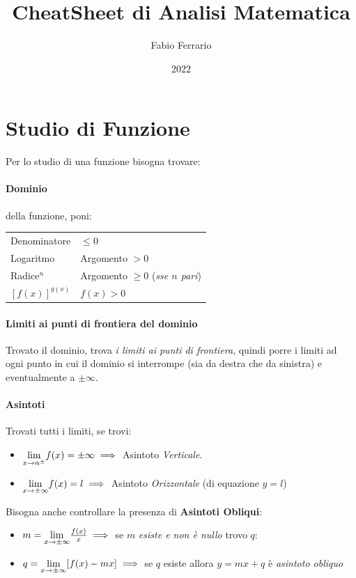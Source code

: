 \documentclass[12pt, a4paper]{article}
\begin{document}
\title{CheatSheet di Analisi Matematica}
\author{Fabio Ferrario}
\date{2022}
\maketitle
\section*{Studio di Funzione}
Per lo studio di una funzione bisogna trovare:
\paragraph*{Dominio} della funzione, poni:\\

\begin{tabular}{ l|l }
	Denominatore    & $\leq 0$                                 \\
	Logaritmo       & Argomento $>0$                           \\
	Radice$^n$      & Argomento $\geq 0$ (\emph{sse $n$ pari}) \\
	$[f(x)]^{g(x)}$ & $f(x)>0$
\end{tabular}
\paragraph*{Limiti ai punti di frontiera del dominio}
Trovato il dominio, trova \emph{i limiti ai punti di frontiera},
quindi porre i limiti ad ogni punto in cui il dominio si interrompe (sia da destra che da sinistra) e eventualmente a $\pm \infty$.
\paragraph*{Asintoti}
Trovati tutti i limiti, se trovi:
\begin{itemize}
	\item $\underset{x \to \alpha^\pm}{\lim} f(x) = \pm \infty \implies$ Asintoto \emph{Verticale}.
	\item $\underset{x \to \pm \infty}{\lim} f(x) = l \implies$ Asintoto \emph{Orizzontale} (di equazione $y=l$)
\end{itemize}
Bisogna anche controllare la presenza di \textbf{Asintoti Obliqui}:
\begin{itemize}
	\item $m = \underset{x \to \pm \infty}{\lim} \frac{f(x)}{x} \implies$ se $m$ \emph{esiste e non è nullo} trovo $q$:
	\item $q = \underset{x \to \pm \infty}{\lim} [f(x) - mx]\implies$  se $q$ esiste allora $y=mx+q$ è \emph{asintoto obliquo}
\end{itemize}
\end{document}
